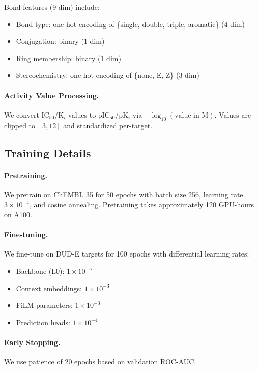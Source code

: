 \documentclass{article}
\begin{document}
Bond features (9-dim) include:
\begin{itemize}[noitemsep]
    \item Bond type: one-hot encoding of \{single, double, triple, aromatic\} (4 dim)
    \item Conjugation: binary (1 dim)
    \item Ring membership: binary (1 dim)
    \item Stereochemistry: one-hot encoding of \{none, E, Z\} (3 dim)
\end{itemize}

\paragraph{Activity Value Processing.} We convert IC$_{50}$/K$_i$ values to pIC$_{50}$/pK$_i$ via $-\log_{10}(\text{value in M})$. Values are clipped to $[3, 12]$ and standardized per-target.

\subsection{Training Details}

\paragraph{Pretraining.} We pretrain on ChEMBL 35 for 50 epochs with batch size 256, learning rate $3 \times 10^{-4}$, and cosine annealing. Pretraining takes approximately 120 GPU-hours on A100.

\paragraph{Fine-tuning.} We fine-tune on DUD-E targets for 100 epochs with differential learning rates:
\begin{itemize}[noitemsep]
    \item Backbone (L0): $1 \times 10^{-5}$
    \item Context embeddings: $1 \times 10^{-3}$
    \item FiLM parameters: $1 \times 10^{-3}$
    \item Prediction heads: $1 \times 10^{-4}$
\end{itemize}

\paragraph{Early Stopping.} We use patience of 20 epochs based on validation ROC-AUC.
\end{document}
